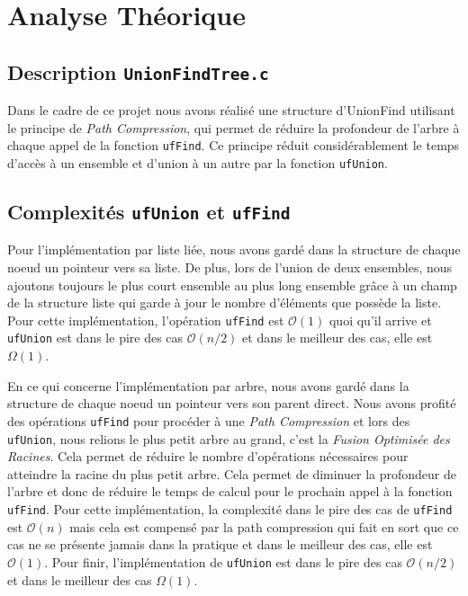 \documentclass[12pt]{article}
\begin{document}
\section{Analyse Théorique}

\subsection{Description \texttt{UnionFindTree.c}}
Dans le cadre de ce projet nous avons réalisé une structure d'UnionFind utilisant le principe de \textit{Path Compression}, 
qui permet de réduire la profondeur de l'arbre à chaque appel de la fonction \texttt{ufFind}. Ce principe réduit considérablement
le temps d'accès à un ensemble et d'union à un autre par la fonction \texttt{ufUnion}.

\subsection{Complexités \texttt{ufUnion} et \texttt{ufFind}}

Pour l'implémentation par liste liée, nous avons gardé dans la structure de chaque noeud un pointeur vers sa liste. 
De plus, lors de l'union de deux ensembles, nous ajoutons toujours le plus court ensemble au plus long ensemble 
grâce à un champ de la structure liste qui garde à jour le nombre d'éléments que possède la liste.
Pour cette implémentation, l'opération \texttt{ufFind} est $\mathcal{O} (1)$ quoi qu'il arrive et
\texttt{ufUnion} est dans le pire des cas $\mathcal{O}(n/2)$ et dans le meilleur des cas, elle est $\Omega(1)$.

En ce qui concerne l'implémentation par arbre, nous avons gardé dans la structure de chaque noeud un pointeur vers son parent direct. 
Nous avons profité des opérations \texttt{ufFind} pour procéder à une \textit{Path Compression} 
et lors des \texttt{ufUnion}, nous relions le plus petit arbre au grand, c'est la \textit{Fusion Optimisée des Racines}.
Cela permet de réduire le nombre d'opérations nécessaires pour atteindre la racine du plus petit arbre.
Cela permet de diminuer la profondeur de l'arbre 
et donc de réduire le temps de calcul pour le prochain appel à la fonction \texttt{ufFind}. 
Pour cette implémentation, la complexité dans le pire des cas de \texttt{ufFind} est $\mathcal{O} (n)$ 
mais cela est compensé par la path compression
qui fait en sort que ce cas ne se présente jamais dans la pratique 
et dans le meilleur des cas, elle est  $\mathcal{O} (1)$. 
Pour finir, l'implémentation de \texttt{ufUnion} est dans le pire des cas $\mathcal{O}(n/2)$ et dans le meilleur des cas $\Omega (1)$.
\end{document}
